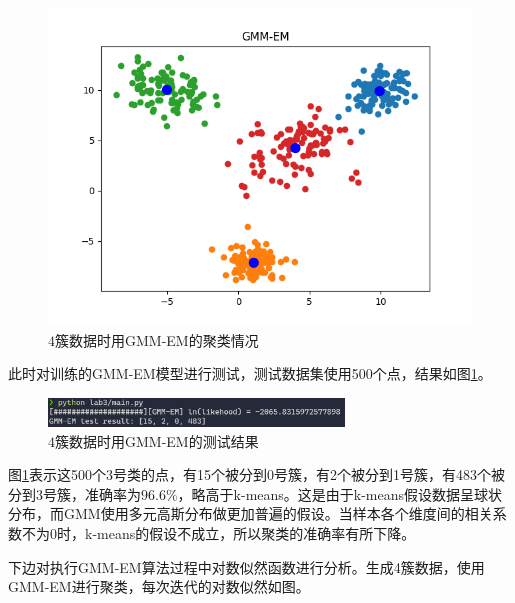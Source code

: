\begin{figure}[htbp]
\begin{minipage}[t]{0.3\linewidth}
        \includegraphics[width=\textwidth]{figures/Figure_13.png}
        \caption{$4$簇数据时用GMM-EM的聚类情况}
    \end{minipage}
\end{figure}

此时对训练的GMM-EM模型进行测试，测试数据集使用500个点，结果如图\ref{cluster4-test}。

\begin{figure}[htbp]
    \centering
    \includegraphics[width=0.7\textwidth]{figures/Figure_14.png}
    \caption{$4$簇数据时用GMM-EM的测试结果}
    \label{cluster4-test}
\end{figure}

图\ref{cluster4-test}表示这500个3号类的点，有15个被分到0号簇，有2个被分到1号簇，有483个被分到3号簇，准确率为$96.6\%$，略高于k-means。这是由于k-means假设数据呈球状分布，而GMM使用多元高斯分布做更加普遍的假设。当样本各个维度间的相关系数不为0时，k-means的假设不成立，所以聚类的准确率有所下降。

下边对执行GMM-EM算法过程中对数似然函数进行分析。生成4簇数据，使用GMM-EM进行聚类，每次迭代的对数似然如图。

